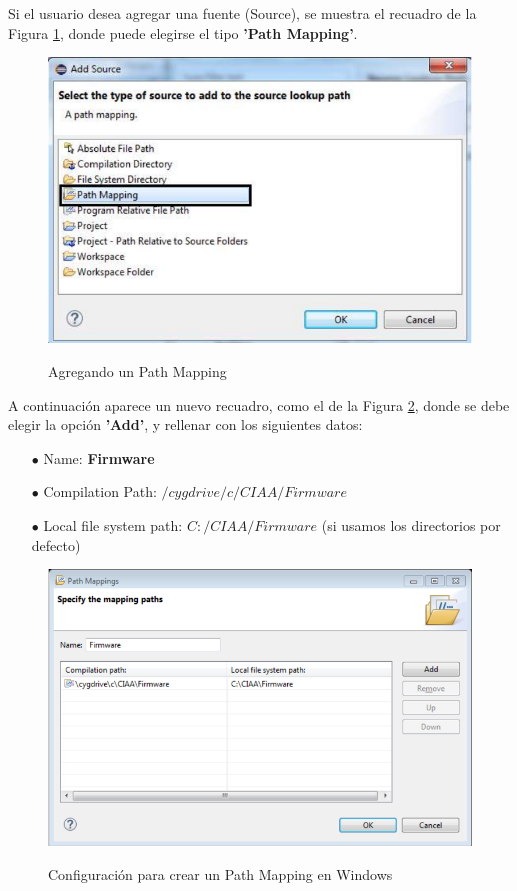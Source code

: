 \documentclass[12pt,letterpaper]{article}
\begin{document}
Si el usuario desea agregar una fuente (Source), se muestra el recuadro de la Figura \ref{primer_proy16}, donde puede elegirse el tipo \textbf{'Path Mapping'}.

\begin{center}
\begin{figure}[!h]
\centering
\includegraphics[width=5 cm]{figuras/primer_proy16.png}\\
\caption{Agregando un Path Mapping}
\label{primer_proy16}
\end{figure}
\end{center}

A continuación aparece un nuevo recuadro, como el de la Figura \ref{primer_proy17}, donde se debe elegir la opción
\textbf{'Add'}, y rellenar con los siguientes datos:

\begin{enumerate}
\item[$\bullet$]Name: \textbf{Firmware}
\item[$\bullet$]Compilation Path: \textbf{$/cygdrive/c/CIAA/Firmware$}

\item[$\bullet$]Local file system path: \textbf{$C:/CIAA/Firmware$} (si usamos los directorios por defecto)
\end{enumerate}

\begin{center}
\begin{figure}[!h]
\centering
\includegraphics[width=8 cm]{figuras/primer_proy17.png}\\
\caption{Configuración para crear un Path Mapping en Windows}
\label{primer_proy17}
\end{figure}
\end{center}
\end{document}
